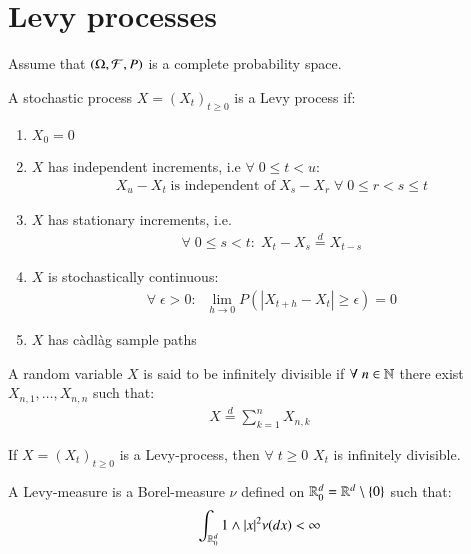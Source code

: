 \newpage

\newpage
\section{Levy processes}
Assume that $(\Omega, \mathcal{F}, P)$ is a complete probability space. 

\begin{definition}
A stochastic process $X = (X_{t})_{t\geq 0}$ is a Levy process if:
\begin{enumerate}[leftmargin =*]
    \item $X_{0} = 0$
    \item $X$ has independent increments, i.e $\forall \; 0\leq t < u:$
    \begin{align*}
    X_{u}-X_{t}\;\text{is independent of}\;X_{s}-X_{r}\; \forall\; 0 \leq r < s \leq t    
    \end{align*}
    \item $X$ has stationary increments, i.e. 
    \begin{align*}
    \forall\; 0 \leq s < t: \; X_{t}-X_{s} \stackrel{d}{=} X_{t-s}
    \end{align*}
    \item $X$ is stochastically continuous: 
    \begin{align*}
    \forall \; \epsilon > 0: \;\; \lim\limits_{h \to 0}P(|X_{t+h}-X_{t}| \geq \epsilon) = 0 
    \end{align*}
    \item $X$ has càdlàg  sample paths
\end{enumerate}
\end{definition}

\begin{definition}
A random variable $X$ is said to be infinitely divisible if $\forall\; n\in \mathbb{N}$ there exist $X_{n,1}, \dots, X_{n,n}$ such that: 
\begin{align*}
X \stackrel{d}{=} \sum_{k=1}^{n}X_{n,k}
\end{align*}
\end{definition}

\begin{proposition}
If $X = (X_{t})_{t\geq 0}$ is a Levy-process, then $\forall\; t\geq 0$ $X_{t}$ is infinitely divisible. 
\end{proposition}

\begin{definition}
A Levy-measure is a Borel-measure  $\nu$  defined on $\mathbb{R}_{0}^{d} = \mathbb{R}^{d}\setminus \{0\}$ 
such that: 
\begin{align*}
\int_{\mathbb{R}_{0}^{d}}1\wedge|x|^{2}\nu(dx) < \infty    
\end{align*}
\end{definition}

